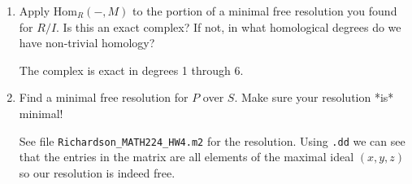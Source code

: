 \documentclass[11pt,oneside,english]{amsart}
\theoremstyle{definition}
\newcommand{\Hom}{\text{Hom}}
\begin{document}
\begin{enumerate}[leftmargin=*]
\begin{enumerate}
and \verb!res(M)! gives
\[
\xymatrix{R^2 & \ar[l] R^3 & \ar[l] R^4 & \ar[l] R^9 & \ar[l] R^{17} & \ar[l] R^{27} & \ar[l] R^{39} & \ar[l] R^{53} \\
0 & 1 & 2 & 3 & 4 & 5 & 6 & 7},
\]

\item Apply $\Hom_R(-,M)$ to the portion of a minimal free resolution you found for $R/I$. Is this an exact complex? If not, in what homological degrees do we have non-trivial homology? 

The complex is exact in degrees 1 through 6.

\item Find a minimal free resolution for $P$ over $S$. Make sure your resolution *is* minimal!

See file \verb!Richardson_MATH224_HW4.m2! for the resolution. Using \verb!.dd! we can see that the entries in the matrix are all elements of the maximal ideal $(x,y,z)$ so our resolution is indeed free.
\end{enumerate}
\end{enumerate}
\end{document}

